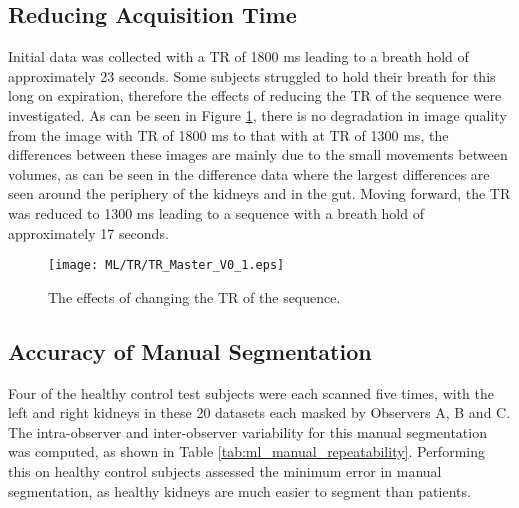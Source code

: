 \subsection{Reducing Acquisition Time}
Initial data was collected with a \ac{TR} of 1800 ms leading to a breath hold of approximately 23 seconds. Some subjects struggled to hold their breath for this long on expiration, therefore the effects of reducing the \ac{TR} of the sequence were investigated. As can be seen in Figure \ref{fig:ml_tr}, there is no degradation in image quality from the image with \ac{TR} of 1800 ms to that with at \ac{TR} of 1300 ms, the differences between these images are mainly due to the small movements between volumes, as can be seen in the difference data where the largest differences are seen around the periphery of the kidneys and in the gut. Moving forward, the \ac{TR} was reduced to 1300 ms leading to a sequence with a breath hold of approximately 17 seconds.

\begin{figure}[H]
	\centering
	\texttt{[image: ML/TR/TR\_Master\_V0\_1.eps]}
	\caption{The effects of changing the \ac{TR} of the sequence.}
	\label{fig:ml_tr}	
\end{figure}

\subsection{Accuracy of Manual Segmentation}
Four of the healthy control test subjects were each scanned five times, with the left and right kidneys in these 20 datasets each masked by Observers A, B and C. The intra-observer and inter-observer variability for this manual segmentation was computed, as shown in Table \ref{tab:ml_manual_repeatability}. Performing this on healthy control subjects assessed the minimum error in manual segmentation, as healthy kidneys are much easier to segment than patients.

